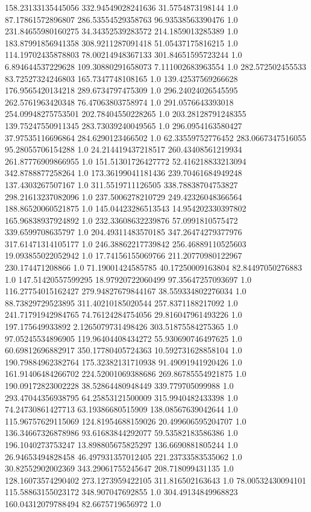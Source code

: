 158.23133135445056	332.94549028241636	31.5754873198144	1.0
87.17861572896807	286.53554529358763	96.93538563390476	1.0
231.84655980160275	34.34352539283572	214.1859013285389	1.0
183.87991856941358	308.9211287091418	51.05437175816215	1.0
114.19702435878803	78.00214948367133	301.84651595723244	1.0
6.894644537229628	109.30880291658073	7.111002683963554	1.0
282.572502455533	83.72527324246803	165.7347748108165	1.0
139.42537569266628	176.9565420134218	289.6734797475309	1.0
296.24024026545595	262.5761963420348	76.47063803758974	1.0
291.0576643393018	254.09948275753501	202.78404550228265	1.0
203.28128791248355	139.75247550911345	283.73039240049565	1.0
296.0954163580427	37.97535116696864	284.6290123466502	1.0
62.33559752776452	283.0667347516055	95.28055706154288	1.0
24.214419437218517	260.43408561219934	261.87776909866955	1.0
151.51301726427772	52.416218833213094	342.8788877258264	1.0
173.36199041181436	239.70461684949248	137.4303267507167	1.0
311.5519711126505	338.78838704753827	298.21613237082096	1.0
237.5006278210729	249.42326048366564	188.86520060521875	1.0
145.04423286513543	14.954202330397802	165.96838937924892	1.0
232.33608632239876	57.0991810575472	339.6599708635797	1.0
204.49311483570185	347.26474279377976	317.61471314105177	1.0
246.38862217739842	256.46889110525603	19.093855022052942	1.0
17.74156155069766	211.20770980122967	230.174471208866	1.0
71.19001424585785	40.17250009163804	82.84497050276883	1.0
147.51420557599295	18.97920722060499	97.35647257093697	1.0
116.27754015162427	279.94827679844167	38.559334802276034	1.0
88.73829729523895	311.40210185020544	257.8371188217092	1.0
241.71791942984765	74.76124284754056	29.816047961493226	1.0
197.175649933892	2.1265079731498426	303.51875584275365	1.0
97.05245534896905	119.96404408434272	55.930690746497625	1.0
60.69812696882917	350.17780405724363	10.592731628858104	1.0
190.79884962382764	175.32382131710938	91.49091941920426	1.0
161.91406484266702	224.52001069388686	269.86785554921875	1.0
190.09172823002228	38.52864480948449	339.779705099988	1.0
293.47044356938795	64.25853121500009	315.9940482433398	1.0
74.24730861427713	63.19386680515909	138.08567639042644	1.0
115.96757629115069	124.81954688159026	20.499606595204707	1.0
136.34667326878986	93.61683844292077	59.53582183586386	1.0
196.1040273753247	13.898805675825297	136.6690881805244	1.0
26.94653494828458	46.497931357012405	221.23733583535062	1.0
30.82552902002369	343.29061755245647	208.718099431135	1.0
128.16073574290402	273.1273959422105	311.816502163643	1.0
78.00532430094101	115.58863155023172	348.907047692855	1.0
304.49134849968823	160.04312079788494	82.6675719656972	1.0
